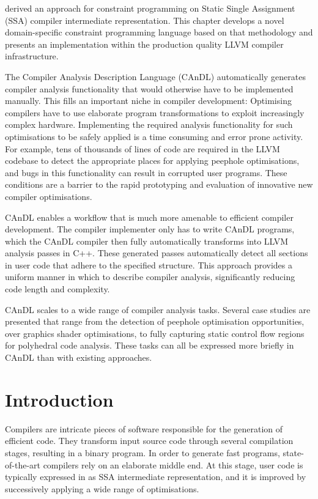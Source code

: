 
     derived an approach for constraint programming on
    Static Single Assignment (SSA) compiler intermediate representation.
    This chapter develops a novel domain-specific constraint programming
    language based on that methodology and presents an implementation within the
    production quality LLVM compiler infrastructure.

    The Compiler Analysis Description Language (CAnDL) automatically generates
    compiler analysis functionality that would otherwise have to be implemented
    manually.
    This fills an important niche in compiler development:
    Optimising compilers have to use elaborate program transformations to exploit
    increasingly complex hardware.
    Implementing the required analysis functionality for such optimisations to
    be safely applied is a time consuming and error prone activity.
    For example, tens of thousands of lines of code are required in the LLVM
    codebase to detect the appropriate places for applying peephole
    optimisations, and bugs in this functionality can result in corrupted user
    programs.
    These conditions are a barrier to the rapid prototyping and evaluation of
    innovative new compiler optimisations.

    CAnDL enables a workflow that is much more amenable to efficient compiler
    development.
    The compiler implementer only has to write CAnDL programs, which the CAnDL
    compiler then fully automatically transforms into LLVM analysis passes in
    C++.
    These generated passes automatically detect all sections in user code that
    adhere to the specified structure.
    This approach provides a uniform manner in which to describe compiler
    analysis, significantly reducing code length and complexity.

    CAnDL scales to a wide range of compiler analysis tasks.
    Several case studies are presented that range from the detection of
    peephole optimisation opportunities, over graphics shader optimisations,
    to fully capturing static control flow regions for polyhedral code analysis.
    These tasks can all be expressed more briefly in CAnDL than with existing
    approaches.

\section{Introduction}

    Compilers are intricate pieces of software responsible for the generation of
    efficient code.
    They transform input source code through several compilation stages,
    resulting in a binary program.
    In order to generate fast programs, state-of-the-art compilers rely on an
    elaborate middle end.
    At this stage, user code is typically expressed in as SSA intermediate
    representation, and it is improved by successively applying a wide range of
    optimisations.

